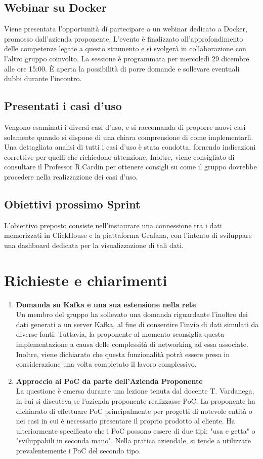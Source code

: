\documentclass{article}
\begin{document}
\subsection{Webinar su Docker}
Viene presentata l'opportunità di partecipare a un webinar dedicato a Docker, promosso dall'azienda proponente. L'evento è finalizzato all'approfondimento delle competenze legate a questo strumento e si svolgerà in collaborazione con l'altro gruppo coinvolto. La sessione è programmata per mercoledì 29 dicembre alle ore 15:00. È aperta la possibilità di porre domande e sollevare eventuali dubbi durante l'incontro.
\subsection{Presentati i casi d'uso}
Vengono esaminati i diversi casi d'uso, e si raccomanda di proporre nuovi casi solamente quando si dispone di una chiara comprensione di come implementarli. Una dettagliata analisi di tutti i casi d'uso è stata condotta, fornendo indicazioni correttive per quelli che richiedono attenzione.
 Inoltre, viene consigliato di consultare il Professor R.Cardin per ottenere consigli su come il gruppo dovrebbe procedere nella realizzazione dei casi d'uso.
\subsection{Obiettivi prossimo Sprint}
L'obiettivo preposto consiste nell'instaurare una connessione tra i dati memorizzati in ClickHouse e la piattaforma Grafana, con l'intento di sviluppare una dashboard dedicata per la visualizzazione di tali dati.
\section{Richieste e chiarimenti}
\begin{enumerate}
    \item \textbf{Domanda su Kafka e una sua estensione nella rete}\\
    Un membro del gruppo ha sollevato una domanda riguardante l'inoltro dei dati generati a un server Kafka, al fine di consentire l'invio di dati simulati da diverse fonti. Tuttavia, la proponente al momento sconsiglia questa implementazione a causa delle complessità di networking ad essa associate. 
    Inoltre, viene dichiarato che questa funzionalità potrà essere presa in considerazione una volta completato il lavoro complessivo.
    \item \textbf{Approccio ai PoC da parte dell'Azienda Proponente}\\
    La questione è emersa durante una lezione tenuta dal docente T. Vardanega, in cui si discuteva se l'azienda proponente realizzasse PoC. La proponente ha dichiarato di effettuare PoC principalmente per progetti di notevole entità o nei casi in cui è necessario presentare il proprio prodotto al cliente. 
    Ha ulteriormente specificato che i PoC possono essere di due tipi: "usa e getta" o "sviluppabili in seconda mano".
    Nella pratica aziendale, si tende a utilizzare prevalentemente i PoC del secondo tipo.
\end{enumerate}
    
\end{document}
